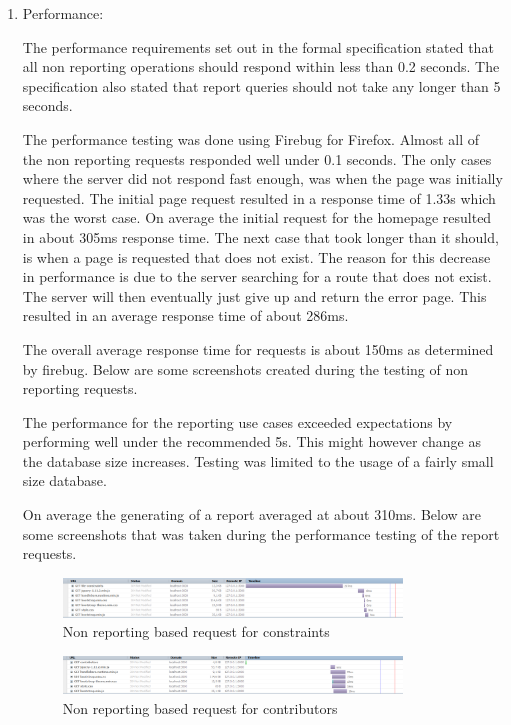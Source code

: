 \documentclass[hidelinks, 12pt, oneside]{article}
\begin{document}
\begin{enumerate}
\item Performance:

The performance requirements set out in the formal specification stated that all non reporting operations should respond within less than 0.2 seconds. The specification also stated that report queries should not take any longer than 5 seconds.

The performance testing was done using Firebug for Firefox. Almost all of the non reporting requests responded well under 0.1 seconds. The only cases where the server did not respond fast enough, was when the page was initially requested. The initial page request resulted in a response time of 1.33s which was the worst case. On average the initial request for the homepage resulted in about 305ms response time. 
The next case that took longer than it should, is when a page is requested that does not exist. The reason for this decrease in performance is due to the server searching for a route that does not exist. The server will then eventually just give up and return the error page. This resulted in an average response time of about 286ms. 

The overall average response time for requests is about 150ms as determined by firebug. Below are some screenshots created during the testing of non reporting requests.

The performance for the reporting use cases exceeded expectations by performing well under the recommended 5s. This might however change as the database size increases. Testing was limited to the usage of a fairly small size database. 

On average the generating of a report averaged at about 310ms. Below are some screenshots that was taken during the performance testing of the report requests. 

\begin{figure}[h!]
  \centering
    \includegraphics[width=0.85\textwidth]{performance1}
    \caption{Non reporting based request for constraints}
\end{figure}

\begin{figure}[h!]
  \centering
    \includegraphics[width=0.85\textwidth]{performance2}
    \caption{Non reporting based request for contributors}
\end{figure}


\end{enumerate}
\end{document}
